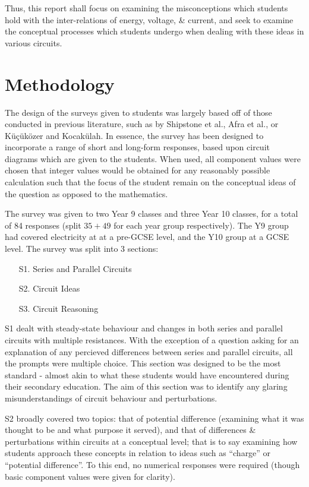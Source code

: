 \documentclass[a4paper,openany,nobib]{tufte-book}
\begin{document}
Thus, this report shall focus on examining the misconceptions which students hold with the inter-relations of energy, voltage, \& current, and seek to examine the conceptual processes which students undergo when dealing with these ideas in various circuits.
\newpage
\chapter{Methodology}%
The design of the surveys given to students was largely based off of those conducted in previous literature, such as by Shipstone et al., Afra et al., or Küçüközer and Kocakülah\autocite{shipstone_europe,afra2009,kucu2007}. In essence, the survey has been designed to incorporate a range of short and long-form responses, based upon circuit diagrams which are given to the students. When used, all component values were chosen that integer values would be obtained for any reasonably possible calculation such that the focus of the student remain on the conceptual ideas of the question as opposed to the mathematics.

The survey was given to two Year 9 classes and three Year 10 classes, for a total of 84 responses (split $35+49$ for each year group respectively). The Y9 group had covered electricity at at a pre-GCSE level, and the Y10 group at a GCSE level. The survey was split into 3 sections:
\begin{itemize}
	\item[S1.] Series and Parallel Circuits
	\item[S2.] Circuit Ideas
	\item[S3.] Circuit Reasoning
\end{itemize}
S1 dealt with steady-state behaviour and changes in both series and parallel circuits with multiple resistances. With the exception of a question asking for an explanation of any percieved differences between series and parallel circuits, all the prompts were multiple choice. This section was designed to be the most standard - almost akin to what these students would have encountered during their secondary education. The aim of this section was to identify any glaring misunderstandings of circuit behaviour and perturbations.

S2 broadly covered two topics:
that of potential difference (examining what it was thought to be and what purpose it served), and that of differences \& perturbations within circuits at a conceptual level; that is to say examining how students approach these concepts in relation to ideas such as ``charge'' or ``potential difference''. 
To this end, no numerical responses were required (though basic component values were given for clarity).
\end{document}
